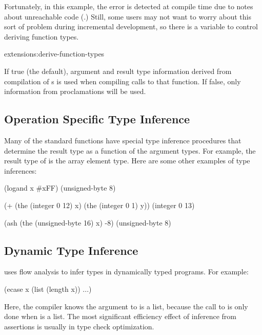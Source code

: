 Fortunately, in this example, the error is detected at compile time
due to notes about unreachable code (.)
Still, some users may not want to worry about this sort of problem
during incremental development, so there is a variable to control
deriving function types.

\begin{defvar}{extensions:}{derive-function-types}
  
  If true (the default), argument and result type information derived
  from compilation of s is used when compiling calls to
  that function.  If false, only information from 
  proclamations will be used.
\end{defvar}


\subsection{Operation Specific Type Inference}
\label{operation-type-inference}

Many of the standard \clisp{} functions have special type inference
procedures that determine the result type as a function of the
argument types.  For example, the result type of  is the
array element type.  Here are some other examples of type inferences:
\begin{lisp}
(logand x #xFF) \result{} (unsigned-byte 8)

(+ (the (integer 0 12) x) (the (integer 0 1) y)) \result{} (integer 0 13)

(ash (the (unsigned-byte 16) x) -8) \result{} (unsigned-byte 8)
\end{lisp}


\subsection{Dynamic Type Inference}
\label{constraint-propagation}

\python{} uses flow analysis to infer types in dynamically typed
programs.  For example:

\begin{example}
(ecase x
  (list (length x))
  ...)
\end{example}

Here, the compiler knows the argument to  is a list,
because the call to  is only done when  is a
list.  The most significant efficiency effect of inference from
assertions is usually in type check optimization.

